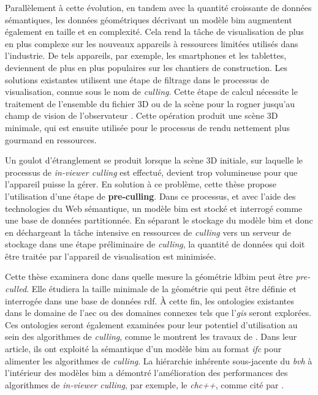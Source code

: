\begin{refsection}
\begin{multicols}{2}
        Parallèlement à cette évolution, en tandem avec la quantité croissante de données sémantiques, les données géométriques décrivant un modèle \ac{bim} augmentent également en taille et en complexité. Cela rend la tâche de visualisation de plus en plus complexe sur les nouveaux appareils à ressources limitées utilisés dans l'industrie. De tels appareils, par exemple, les smartphones et les tablettes, deviennent de plus en plus populaires sur les chantiers de construction. Les solutions existantes utilisent une étape de filtrage dans le processus de visualisation, connue sous le nom de \emph{culling}. Cette étape de calcul nécessite le traitement de l'ensemble du fichier 3D ou de la scène pour la rogner jusqu'au champ de vision de l'observateur \parencite{Johansson2015}. Cette opération produit une scène 3D minimale, qui est ensuite utilisée pour le processus de rendu nettement plus gourmand en ressources.

        Un goulot d'étranglement se produit lorsque la scène 3D initiale, sur laquelle le processus de \emph{in-viewer culling} est effectué, devient trop volumineuse pour que l'appareil puisse la gérer. En solution à ce problème, cette thèse propose l'utilisation d'une étape de \textbf{pre-culling}. Dans ce processus, et avec l'aide des technologies du Web sémantique, un modèle \ac{bim} est stocké et interrogé comme une base de données partitionnée. En séparant le stockage du modèle \ac{bim} et donc en déchargeant la tâche intensive en ressources de \emph{culling} vers un serveur de stockage dans une étape préliminaire de \emph{culling}, la quantité de données qui doit être traitée par l'appareil de visualisation est minimisée.

        Cette thèse examinera donc dans quelle mesure la géométrie \ac{ldbim} peut être \emph{pre-culled}. Elle étudiera la taille minimale de la géométrie qui peut être définie et interrogée dans une base de données \ac{rdf}. À cette fin, les ontologies existantes dans le domaine de l'\ac{aec} ou des domaines connexes tels que l'\emph{\ac{gis}} seront explorées. Ces ontologies seront également examinées pour leur potentiel d'utilisation au sein des algorithmes de \emph{culling}, comme le montrent les travaux de \cite{Johansson2009}. Dans leur article, ils ont exploité la sémantique d'un modèle \ac{bim} au format \emph{\ac{ifc}} pour alimenter les algorithmes de \emph{culling}. La hiérarchie inhérente sous-jacente du \emph{\ac{bvh}} à l'intérieur des modèles \ac{bim} a démontré l'amélioration des performances des algorithmes de \emph{in-viewer culling}, par exemple, le \emph{\ac{chc}++}, comme cité par \parencite{Johansson2015}.


\end{multicols}
\end{refsection}
